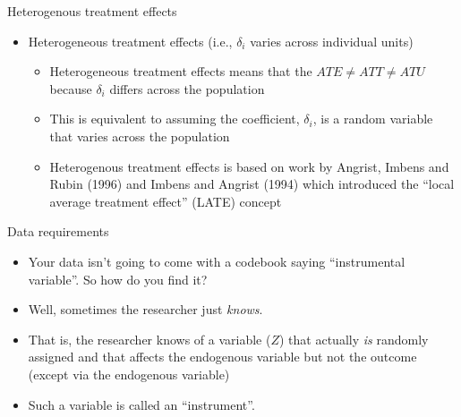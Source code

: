 \documentclass{beamer}
\begin{document}
\begin{frame}{Heterogenous treatment effects}

  \begin{itemize}
    \item Heterogeneous treatment effects (i.e., $\delta_i$ varies across individual units)
          \begin{itemize}
            \item Heterogeneous treatment effects means that the $ATE\neq{ATT}\neq{ATU}$ because $\delta_i$ differs across the population
            \item This is equivalent to assuming the coefficient, $\delta_i$, is a random variable that varies across the population
            \item Heterogenous treatment effects is based on work by Angrist, Imbens and Rubin (1996) and Imbens and Angrist (1994) which introduced the  ``local average treatment effect'' (LATE) concept
          \end{itemize}
  \end{itemize}

\end{frame}

\begin{frame}{Data requirements}

  \begin{itemize}
    \item Your data isn't going to come with a codebook saying ``instrumental variable''.  So how do you find it?
    \item Well, sometimes the researcher just \emph{knows}.
    \item That is, the researcher knows of a variable ($Z$) that actually \emph{is} randomly assigned and that affects the endogenous variable but not the outcome (except via the endogenous variable)
    \item Such a variable is called an ``instrument''.
  \end{itemize}
\end{frame}
\end{document}
